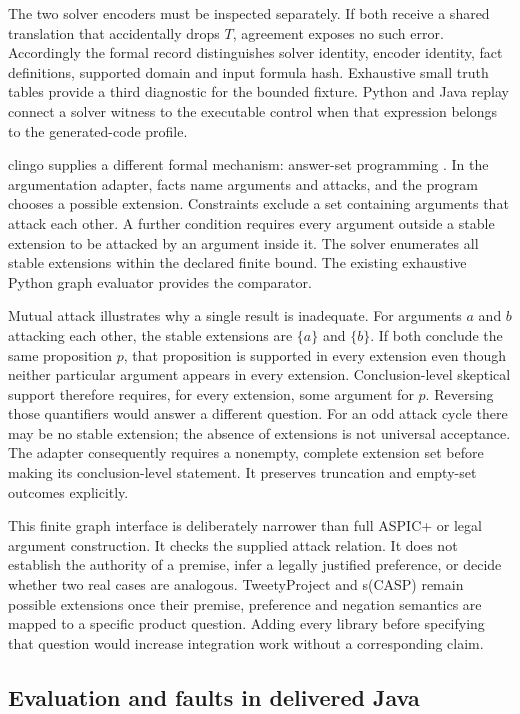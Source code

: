 The two solver encoders must be inspected separately. If both receive a shared
translation that accidentally drops $T$, agreement exposes no such error.
Accordingly the formal record distinguishes solver identity, encoder identity,
fact definitions, supported domain and input formula hash. Exhaustive small
truth tables provide a third diagnostic for the bounded fixture. Python and Java
replay connect a solver witness to the executable control when that expression
belongs to the generated-code profile.

clingo supplies a different formal mechanism: answer-set programming
\citep{clingosoftware}. In the argumentation adapter, facts name arguments and
attacks, and the program chooses a possible extension. Constraints exclude a set
containing arguments that attack each other. A further condition requires every
argument outside a stable extension to be attacked by an argument inside it.
The solver enumerates all stable extensions within the declared finite bound.
The existing exhaustive Python graph evaluator provides the comparator.

Mutual attack illustrates why a single result is inadequate. For arguments $a$
and $b$ attacking each other, the stable extensions are $\{a\}$ and $\{b\}$.
If both conclude the same proposition $p$, that proposition is supported in every
extension even though neither particular argument appears in every extension.
Conclusion-level skeptical support therefore requires, for every extension,
some argument for $p$. Reversing those quantifiers would answer a different
question. For an odd attack cycle there may be no stable extension; the absence
of extensions is not universal acceptance. The adapter consequently requires a
nonempty, complete extension set before making its conclusion-level statement.
It preserves truncation and empty-set outcomes explicitly.

This finite graph interface is deliberately narrower than full ASPIC+ or legal
argument construction. It checks the supplied attack relation. It does not
establish the authority of a premise, infer a legally justified preference, or
decide whether two real cases are analogous. TweetyProject and s(CASP) remain
possible extensions once their premise, preference and negation semantics are
mapped to a specific product question. Adding every library before specifying
that question would increase integration work without a corresponding claim.

\subsection{Evaluation and faults in delivered Java}

